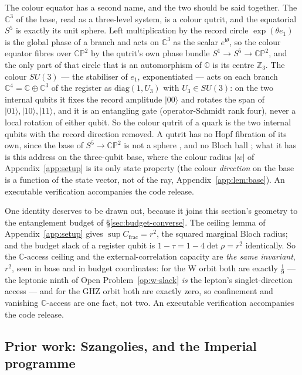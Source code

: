 The colour equator has a second name, and the two should be said together. The $\mathbb{C}^3$ of the
base, read as a three-level system, is a colour qutrit, and the equatorial $S^5$ is exactly its unit
sphere. Left multiplication by the record circle $\exp(\theta e_1)$ is the global phase of a branch
and acts on $\mathbb{C}^3$ as the scalar $e^{\mathrm{i}\theta}$, so the colour equator fibres over
$\mathbb{CP}^2$ by the qutrit's own phase bundle $S^1\to S^5\to\mathbb{CP}^2$, and the only part of
that circle that is an automorphism of $\mathbb{O}$ is its centre $\mathbb{Z}_3$. The colour
$SU(3)$ --- the stabiliser of $e_1$, exponentiated --- acts on each branch
$\mathbb{C}^4 = \mathbb{C}\oplus\mathbb{C}^3$ of the register as $\mathrm{diag}(1, U_3)$ with
$U_3\in SU(3)$: on the two internal qubits it fixes the record amplitude $\lvert 00\rangle$ and
rotates the span of $\lvert 01\rangle, \lvert 10\rangle, \lvert 11\rangle$, and it is an entangling
gate (operator-Schmidt rank four), never a local rotation of either qubit. So the colour qutrit of a
quark is the two internal qubits with the record direction removed. A qutrit has no Hopf fibration
of its own, since the base of $S^5\to\mathbb{CP}^2$ is not a sphere
\autocite{adams1960hopf}, and no Bloch ball \autocite{kimura2003bloch}; what it has is this address
on the three-qubit base, where the colour radius $\lvert w\rvert$ of Appendix~\ref{app:setup} is its
only state property (the colour \emph{direction} on the base is a function of the state vector, not
of the ray, Appendix~\ref{app:lem:base}). An executable verification accompanies the code release.

One identity deserves to be drawn out, because it joins this section's geometry to the entanglement
budget of \S\ref{sec:budget-converse}. The ceiling lemma of Appendix~\ref{app:setup} gives
$\sup C_{\mathrm{frac}} = r^{2}$, the squared marginal Bloch radius; and the budget slack of a
register qubit is $1 - \tau = 1 - 4\det\rho = r^{2}$ identically. So the $\mathbb{C}$-access
ceiling and the external-correlation capacity are \emph{the same invariant}, $r^{2}$, seen in base
and in budget coordinates: for the W orbit both are exactly $\tfrac19$ --- the leptonic ninth of
Open Problem~\ref{op:w-slack} \emph{is} the lepton's singlet-direction access --- and for the GHZ
orbit both are exactly zero, so confinement and vanishing $\mathbb{C}$-access are one fact, not
two. An executable verification accompanies the code release.

\subsection{Prior work: Szangolies, and the Imperial programme}
\label{sec:entanglement-szangolies}

